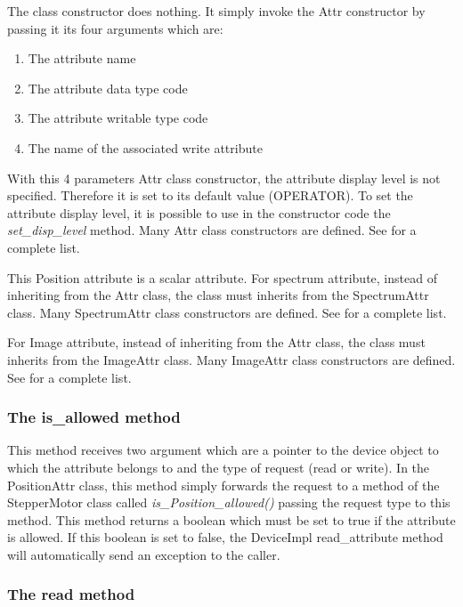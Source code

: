 The class constructor does nothing. It simply invoke the Attr
constructor by passing it its four arguments which are:
\begin{enumerate}
\item The attribute name
\item The attribute data type code
\item The attribute writable type code
\item The name of the associated write attribute
\end{enumerate}
With this 4 parameters Attr class constructor, the attribute display
level is not specified. Therefore it is set to its default value (OPERATOR).
To set the attribute display level, it is possible to use in the constructor
code the \emph{set\_disp\_level} method. Many
Attr class constructors are defined. See \cite{TANGO_ref_man}for
a complete list.

This Position attribute is a scalar attribute. For spectrum attribute,
instead of inheriting from the Attr class, the class must inherits
from the SpectrumAttr class. Many SpectrumAttr
class constructors are defined. See \cite{TANGO_ref_man}for a complete
list.

For Image attribute, instead of inheriting from the Attr class, the
class must inherits from the ImageAttr class. Many ImageAttr
class constructors are defined. See \cite{TANGO_ref_man}for a complete
list. 


\subsubsection{The is\_allowed method}

This method receives two argument which are a pointer to the device
object to which the attribute belongs to and the type of request (read
or write). In the PositionAttr class, this method simply \textquotedbl{}forwards\textquotedbl{}
the request to a method of the StepperMotor class called \emph{is\_Position\_allowed()}
passing the request type to this method. This method returns a boolean
which must be set to true if the attribute is allowed. If this boolean
is set to false, the DeviceImpl read\_attribute
method will automatically send an exception to the caller.


\subsubsection{The read method}

